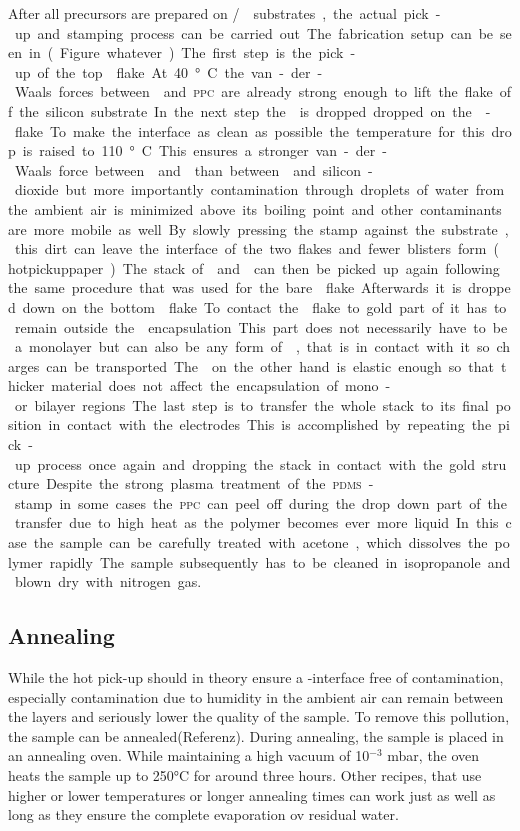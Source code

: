 After all precursors are prepared on \si/\sio substrates, the actual pick-up and stamping process can be carried out. The fabrication setup can be seen in (Figure whatever). The first step is the pick-up of the top \hbng flake. At 40°C the van-der-Waals forces between \hbng and \textsc{ppc} are already strong enough to lift the flake off the silicon substrate. In the next step the \hbng is dropped dropped on the \tmd-flake. To make the interface as clean as possible the temperature for this drop is raised to 110°C. This ensures a stronger van-der-Waals force between \hbng and \tmdg than between \tmdg and silicon-dioxide but more importantly contamination through droplets of water from the ambient air is minimized above its boiling point and other contaminants are more mobile as well. By slowly pressing the stamp against the substrate, this dirt can leave the interface of the two flakes and fewer blisters form(hotpickuppaper). The stack of \tmdg and \hbng can then be picked up again following the same procedure that was used for the bare \hbng flake. Afterwards it is dropped down on the bottom \hbng flake. To contact the \tmdg flake to gold part of it has to remain outside the \hbng encapsulation. This part does not necessarily have to be a monolayer but can also be any form of \tmdg, that is in contact with it so charges can be transported. The \hbng on the other hand is elastic enough so that thicker material does not affect the encapsulation of mono- or bilayer regions.

The last step is to transfer the whole stack to its final position in contact with the electrodes. This is accomplished by repeating the pick-up process once again and dropping the stack in contact with the gold structure.

Despite the strong plasma treatment of the \textsc{pdms}-stamp in some cases the \textsc{ppc} can peel off during the drop down part of the transfer due to high heat as the polymer becomes ever more liquid. In this case the sample can be carefully treated with acetone, which dissolves the polymer rapidly. The sample subsequently has to be cleaned in isopropanole and blown dry with nitrogen gas. 

\subsection{Annealing}

While the hot pick-up should in theory ensure a \hbn-\tmdg interface free of contamination, especially contamination due to humidity in the ambient air can remain between the layers and seriously lower the quality of the sample. To remove this pollution, the sample can be annealed(Referenz). During annealing, the sample is placed in an annealing oven. While maintaining a high vacuum of 10$^{-3}$ mbar, the oven heats the sample up to 250°C for around three hours. Other recipes, that use higher or lower temperatures or longer annealing times can work just as well as long as they ensure the complete evaporation ov residual water. 


